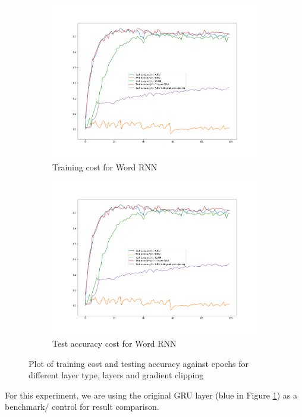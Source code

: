 \begin{figure}[H]
\begin{subfigure}{0.5\textwidth}
        \includegraphics[width=1\linewidth]{assets/plots2/q6_2.png}
        \caption{Training cost for Word RNN}
    \end{subfigure}
    \begin{subfigure}{0.5\textwidth}
        \centering
        \includegraphics[width=1\linewidth]{assets/plots2/q6_4.png}
        \caption{Test accuracy cost for Word RNN}
    \end{subfigure}
    \caption{Plot of training cost and testing accuracy against epochs for different layer type, layers and gradient clipping}
    \label{fig:2_6}
\end{figure}

For this experiment, we are using the original GRU layer (blue in Figure \ref{fig:2_6}) as a benchmark/ control for result comparison.

